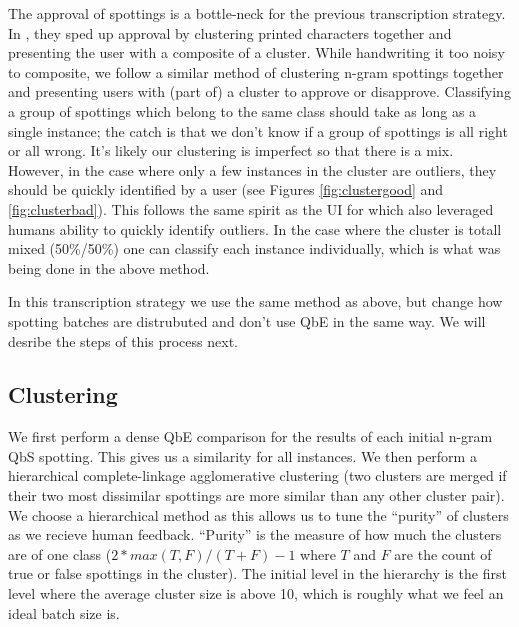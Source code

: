 \documentclass[ms,electronic,twosidetoc,letterpaper,chaptercenter,parttop,lof,lot]{byumsphd}
\begin{document}
The approval of spottings is a bottle-neck for the previous transcription strategy. In \cite{Retsinas2015}, they sped up approval by clustering printed characters together and presenting the user with a composite of a cluster. While handwriting it too noisy to composite, we follow a similar method of clustering n-gram spottings together and presenting users with (part of) a cluster to approve or disapprove. Classifying a group of spottings which belong to the same class should take as long as a single instance; the catch is that we don't know if a group of spottings is all right or all wrong. It's likely our clustering is imperfect so that there is a mix. However, in the case where only a few instances in the cluster are outliers, they should be quickly identified by a user (see Figures \ref{fig:clustergood} and \ref{fig:clusterbad}). This follows the same spirit as the UI for \cite{Clawson2014} which also leveraged humans ability to quickly identify outliers. In the case where the cluster is totall mixed (50\%/50\%) one can classify each instance individually, which is what was being done in the above method.

In this transcription strategy we use the same method as above, but change how spotting batches are distrubuted and don't use QbE in the same way. We will desribe the steps of this process next.

\subsection{Clustering}

We first perform a dense QbE comparison for the results of each initial n-gram QbS spotting. This gives us a similarity for all instances. We then perform a hierarchical complete-linkage agglomerative clustering (two clusters are merged if their two most dissimilar spottings are more similar than any other cluster pair). We choose a hierarchical method as this allows us to tune the ``purity'' of clusters as we recieve human feedback. ``Purity'' is the measure of how much the clusters are of one class ($2*max(T,F)/(T+F)-1$ where $T$ and $F$ are the count of true or false spottings in the cluster). The initial level in the hierarchy is the first level where the average cluster size is above 10, which is roughly what we feel an ideal batch size is.
\end{document}
